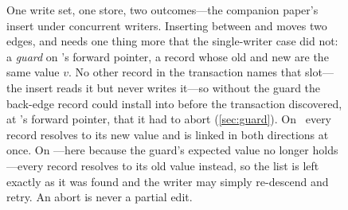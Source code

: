 \begin{figure}[t]
\caption{One write set, one store, two outcomes---the companion paper's insert
under concurrent writers. Inserting  between  and  moves
two edges, and needs one thing more that the single-writer case did not: a
\emph{guard} on 's forward pointer, a record whose old and new are the
same value $v$. No other record in the transaction names that slot---the insert
reads it but never writes it---so without the guard the back-edge record could
install into  before the transaction discovered, at 's forward
pointer, that it had to abort (\cref{sec:guard}). On \SUCCEEDED\ every record resolves to its new value and
 is linked in both directions at once. On \FAILED---here because the
guard's expected value no longer holds---every record resolves to its old value
instead, so the list is left exactly as it was found and the writer may simply
re-descend and retry. An abort is never a partial edit.}
\label{fig:listinsert}
\end{figure}
